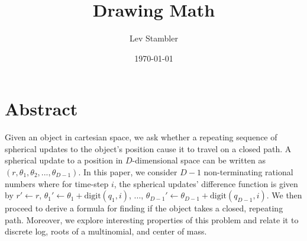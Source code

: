 \documentclass[11pt,titlepage]{article}
\newcommand{\myname}{Lev Stambler}
\begin{document}
\title{Drawing Math}

\author{\myname}

\date{\today}

\maketitle

\pagebreak
\section*{Abstract}
Given an object in cartesian space, we ask whether a repeating sequence 
of spherical updates to the object's position cause it to travel on a closed path.
A spherical update to a position in $D$-dimensional space can be written as
$\left(r, \theta_1, \theta_2, ..., \theta_{D-1}\right)$.
In this paper, we consider $D-1$ non-terminating
rational numbers where for time-step $i$, the spherical updates' difference function
is given by $r' \leftarrow r$, 
$\theta_1' \leftarrow \theta_1 + \mathrm{digit}(q_1, i)$, ..., 
$\theta_{D-1}' \leftarrow \theta_{D-1} + \mathrm{digit}(q_{D-1}, i)$.
We then proceed to derive a formula for finding if the object takes a closed, repeating path.
Moreover, we explore interesting properties of this problem and
relate it to discrete log, roots of a multinomial, and center of mass.
\end{document}

